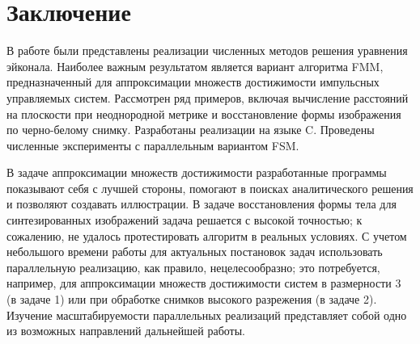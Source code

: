 \section*{Заключение}
\label{sec:conclusion}

В работе были представлены реализации численных методов решения
уравнения эйконала. Наиболее важным результатом является вариант
алгоритма FMM, предназначенный для аппроксимации множеств достижимости
импульсных управляемых систем. Рассмотрен ряд примеров, включая
вычисление расстояний на плоскости при неоднородной метрике и
восстановление формы изображения по черно-белому снимку. Разработаны
реализации на языке C. Проведены численные эксперименты с параллельным
вариантом FSM.

В задаче аппроксимации множеств достижимости разработанные программы
показывают себя с лучшей стороны, помогают в поисках аналитического
решения и позволяют создавать иллюстрации. В задаче восстановления
формы тела для синтезированных изображений задача решается с высокой
точностью; к сожалению, не удалось протестировать алгоритм в реальных
условиях. С учетом небольшого времени работы для актуальных постановок
задач использовать параллельную реализацию, как правило,
нецелесообразно; это потребуется, например, для аппроксимации множеств
достижимости систем в размерности 3 (в задаче 1) или при обработке
снимков высокого разрежения (в задаче 2). Изучение масштабируемости
параллельных реализаций представляет собой одно из возможных
направлений дальнейшей работы.

